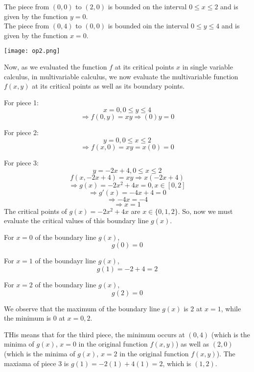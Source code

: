 \documentclass{report}
\begin{document}
\begin{sloppypar}
The piece from $ (0,0) $ to $ (2,0)$ is
bounded on the interval $ 0 \le x \le 2 $
and is given by the function $ y = 0$. \\

The piece from $ (0,4) $ to $ (0,0)$ is
bounded oin the interval $ 0 \le y \le 4 $ and
is given by the function $ x = 0 $.

\begin{center}
  \texttt{[image: op2.png]}
\end{center}

Now, as we evaluated the function $ f$ at its
critical points $ x $ in single variable calculus,
in multivariable calculus, we now evaluate the
multivariable function $ f(x,y)$ at its
critical points as well as its boundary points.

\par For piece 1:
\[ x = 0, 0 \le y \le 4 \]
\[ \Rightarrow f(0,y) = xy \Rightarrow (0)y = 0 \]
\par For piece 2:
\[ y = 0, 0 \le x \le 2 \]
\[ \Rightarrow f(x,0) = xy = x(0) = 0 \]
\par For piece 3:
\[ y = -2x + 4, 0 \le x \le 2 \]
\[ f(x, -2x+4) = xy \Rightarrow x(-2x+4) \]
\[ \Rightarrow g(x) = -2x^{2} + 4x = 0, x \in [0,2]\]
\[ \Rightarrow g'(x) = -4x + 4 = 0 \]
\[ \Rightarrow -4x = -4 \]
\[ \Rightarrow x = 1 \]
The critical points of $ g(x) = -2x^{2} + 4x $ are
$ x \in \{0, 1, 2\}$. So, now we must evaluate
the critical values of this boundary line $ g(x)$.

\par For $x=0$ of the boundary line $ g(x)$,
\[ g(0) = 0 \]
\par For $x=1$ of the boundayr line $ g(x)$,
\[ g(1) = -2 + 4 = 2 \]
\par For $ x=2$ of the boundary line $ g(x)$,
\[ g(2) = 0 \]

We observe that the maximum of the boundary
line $ g(x) $ is $2$ at $ x = 1 $, while
the minimum is $ 0$ at $x = 0,2 $.
\\
\par THis means that for the third piece,
the minimum occurs at $ (0,4)$ (which
is the minima of $g(x)$, $ x = 0$ in
the original function $ f(x,y)$) as well as
$ (2,0)$ (which is the minima of $ g(x)$, $ x = 2$
in the original function $ f(x,y)$). The maxiama
of piece 3 is $g(1) = -2(1) + 4(1) = 2 $, which
is $(1,2)$.


\end{sloppypar}
\end{document}
